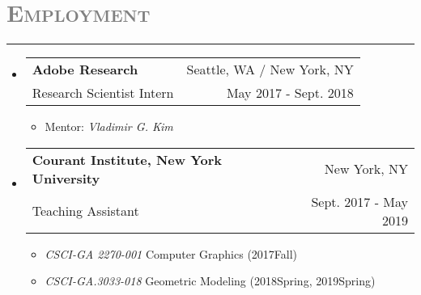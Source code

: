 \documentclass[letterpaper,11pt]{article}
\makeatletter
\newcommand{\resitem}[1]{\item #1 \vspace{-2pt}}
\newcommand{\resheading}[1]{
\vspace{0pt}
\section*{\scshape \textcolor{gray}{#1}}
\rule{\textwidth}{0.5pt}
  \vspace{-15pt}
}
\newcommand{\ressubheading}[4]{\vspace{-2pt}
\begin{tabular*}{6.8in}{l@{\cftdotfill{\cftsecdotsep}\extracolsep{\fill}}r}
		\textbf{#1} & #2 \\
	\parbox[l]{350pt}{#3} & #4 \\
\end{tabular*}\vspace{-6pt}
}
\makeatother
\begin{document}
\resheading{Employment}
\begin{itemize}[label=,leftmargin=*]
		\item 
\ressubheading{Adobe Research}{Seattle, WA / New York, NY}{Research Scientist Intern}{May 2017 - Sept. 2018}
\begin{itemize}[label=,leftmargin=8pt]
	\resitem{Mentor: \textit{Vladimir G. Kim}}
\end{itemize}

\item
\ressubheading{Courant Institute, New York University}{New York, NY}{Teaching Assistant}{Sept. 2017 - May 2019}
\begin{itemize}[label=,leftmargin=8pt]
	\resitem{\textit{CSCI-GA 2270-001} Computer Graphics (2017Fall)}
	\resitem{\textit{CSCI-GA.3033-018} Geometric Modeling (2018Spring, 2019Spring)}
\end{itemize}


\end{itemize}

%
\end{document}
